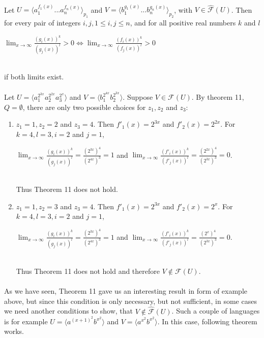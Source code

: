 \paragraph{}
\cdosledok Let $U = \langle a_{1}^{f_{1}(x)}...a_{n}^{f_{n}(x)} \rangle_{p_{1}} $ and $V = \langle b_{1}^{g_{1}(x)}...b_{n}^{g_{n}(x)} \rangle_{p_{2}} $, with $V \in \hat{\mathcal{F}}(U) $. Then for every pair of integers $i, j, 1\leq i, j \leq n$, and for all positive real numbers $k$ and $l$ \\
\centerline{$\lim_{x \to \infty}\frac{(g_{i}(x))^{k}}{(g_{j}(x))^{l}} > 0 \Leftrightarrow \lim_{x \to \infty}\frac{(f_{i}(x))^{k}}{(f_{j}(x))^{l}} > 0$} \\
if both limits exist.

\paragraph{}
\priklad Let $U = \langle a_{1}^{2^{3x}}a_{2}^{2^{2x}}a_{3}^{2^{x}} \rangle $ and $V = \langle b_{1}^{2^{4x}}b_{2}^{2^{3x}} \rangle $. Suppose $V \in \mathcal{F}(U)$. By theorem 11, $Q = \emptyset $, there are only two possible choices for $z_{1}, z_{2}$ and $z_{3}$:
\begin{enumerate}
\item $z_{1} = 1, z_{2} = 2 $ and $z_{3} = 4$. Then $f'_{1}(x) = 2^{3x}$ and $f'_{2}(x) = 2^{2x}$. For $k = 4, l = 3, i = 2$ and $j = 1$,\\
\centerline{$\lim_{x \to \infty}\frac{(g_{i}(x))^{k}}{(g_{j}(x))^{l}} = \frac{(2^{3x})^{4}}{(2^{4x})^{3}} = 1$ and $\lim_{x \to \infty}\frac{(f'_{i}(x))^{k}}{(f'_{j}(x))^{l}} = \frac{(2^{2x})^{4}}{(2^{3x})^{3}} = 0$.}\\
Thus Theorem 11 does not hold.
\item $z_{1} = 1, z_{2} = 3 $ and $z_{3} = 4$. Then $f'_{1}(x) = 2^{3x}$ and $f'_{2}(x) = 2^{x}$. For $k = 4, l = 3, i = 2$ and $j = 1$,\\
\centerline{$\lim_{x \to \infty}\frac{(g_{i}(x))^{k}}{(g_{j}(x))^{l}} = \frac{(2^{3x})^{4}}{(2^{4x})^{3}} = 1$ and $\lim_{x \to \infty}\frac{(f'_{i}(x))^{k}}{(f'_{j}(x))^{l}} = \frac{(2^{x})^{4}}{(2^{3x})^{3}} = 0$.}\\
Thus Theorem 11 does not hold and therefore $V \notin \mathcal{F}(U)$.
\end{enumerate}

\paragraph{}
As we have seen, Theorem 11 gave us an interesting result in form of example above, but since this condition is only necessary, but not sufficient, in some cases we need another conditions to show, that $V \notin \hat{\mathcal{F}}(U)$. Such a couple of languages is for example $U = \langle a^{(x+1)^{2}}b^{x^{2}}\rangle $ and $V = \langle a^{x^{2}}b^{x^{2}}\rangle $. In this case, following theorem works.

